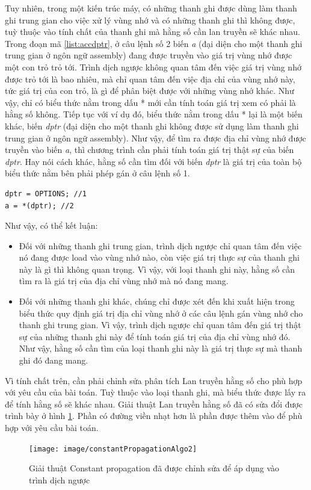 Tuy nhiên, trong một kiến trúc máy, có những thanh ghi được dùng làm thanh ghi trung gian cho việc xử lý vùng nhớ và có những thanh ghi thì không được, tuỳ thuộc vào tính chất của thanh ghi mà hằng số cần lan truyền sẽ khác nhau. Trong đoạn mã \ref{list:accdptr}, ở câu lệnh số 2 biến \textit{a} (đại diện cho một thanh ghi trung gian ở ngôn ngữ assembly) đang được truyền vào giá trị vùng nhớ được một con trỏ trỏ tới. Trình dịch ngược không quan tâm đến việc giá trị vùng nhớ được trỏ tới là bao nhiêu, mà chỉ quan tâm đến việc địa chỉ của vùng nhớ này, tức giá trị của con trỏ, là gì để phân biệt được với những vùng nhớ khác. Như vậy, chỉ có biểu thức nằm trong dấu * mới cần tính toán giá trị xem có phải là hằng số không. Tiếp tục với ví dụ đó, biểu thức nằm trong dấu * lại là một biến khác, biến \textit{dptr} (đại diện cho một thanh ghi không được sử dụng làm thanh ghi trung gian ở ngôn ngữ assembly). Như vậy, để tìm ra được địa chỉ vùng nhớ được truyền vào biến \textit{a}, thì chương trình cần phải tính toán giá trị thật sự của biến \textit{dptr}. Hay nói cách khác, hằng số cần tìm đối với biến \textit{dptr} là giá trị của toàn bộ biểu thức nằm bên phải phép gán ở câu lệnh số 1.
\begin{lstlisting}[caption={Đoạn mã thể hiện hai loại thanh ghi},label={list:accdptr}]
dptr = OPTIONS; //1
a = *(dptr); //2
\end{lstlisting}

Như vậy, có thể kết luận:
\begin{itemize}
	\item Đối với những thanh ghi trung gian, trình dịch ngược chỉ quan tâm đến việc nó đang được load vào vùng nhớ nào, còn việc giá trị thực sự của thanh ghi này là gì thì không quan trọng. Vì vậy, với loại thanh ghi này, hằng số cần tìm ra là giá trị của địa chỉ vùng nhớ mà nó đang mang.
	\item Đối với những thanh ghi khác, chúng chỉ được xét đến khi xuất hiện trong biểu thức quy định giá trị địa chỉ vùng nhớ ở các câu lệnh gán vùng nhớ cho thanh ghi trung gian. Vì vậy, trình dịch ngược chỉ quan tâm đến giá trị thật sự của những thanh ghi này để tính toán giá trị của địa chỉ vùng nhớ đó. Như vậy, hằng số cần tìm của loại thanh ghi này là giá trị thực sự mà thanh ghi đó đang mang.
\end{itemize}

Vì tính chất trên, cần phải chỉnh sửa phân tích Lan truyền hằng số cho phù hợp với yêu cầu của bài toán. Tuỳ thuộc vào loại thanh ghi, mà biểu thức được lấy ra để tính hằng số sẽ khác nhau. Giải thuật Lan truyền hằng số đã có sửa đổi được trình bày ở hình \ref{fig:constantpropagationalgo2}. Phần có đường viền nhạt hơn là phần được thêm vào để phù hợp với yêu cầu bài toán.
\begin{figure}
	\centering
	\texttt{[image: image/constantPropagationAlgo2]}
	\caption{Giải thuật Constant propagation đã được chỉnh sửa để áp dụng vào trình dịch ngược}
	\label{fig:constantpropagationalgo2}
\end{figure}

